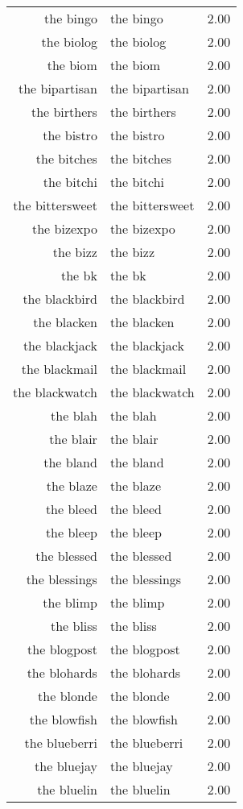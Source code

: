 \begin{table}[ht]
\begin{tabular}{rlr}
  the bingo & the bingo & 2.00 \\ 
  the biolog & the biolog & 2.00 \\ 
  the biom & the biom & 2.00 \\ 
  the bipartisan & the bipartisan & 2.00 \\ 
  the birthers & the birthers & 2.00 \\ 
  the bistro & the bistro & 2.00 \\ 
  the bitches & the bitches & 2.00 \\ 
  the bitchi & the bitchi & 2.00 \\ 
  the bittersweet & the bittersweet & 2.00 \\ 
  the bizexpo & the bizexpo & 2.00 \\ 
  the bizz & the bizz & 2.00 \\ 
  the bk & the bk & 2.00 \\ 
  the blackbird & the blackbird & 2.00 \\ 
  the blacken & the blacken & 2.00 \\ 
  the blackjack & the blackjack & 2.00 \\ 
  the blackmail & the blackmail & 2.00 \\ 
  the blackwatch & the blackwatch & 2.00 \\ 
  the blah & the blah & 2.00 \\ 
  the blair & the blair & 2.00 \\ 
  the bland & the bland & 2.00 \\ 
  the blaze & the blaze & 2.00 \\ 
  the bleed & the bleed & 2.00 \\ 
  the bleep & the bleep & 2.00 \\ 
  the blessed & the blessed & 2.00 \\ 
  the blessings & the blessings & 2.00 \\ 
  the blimp & the blimp & 2.00 \\ 
  the bliss & the bliss & 2.00 \\ 
  the blogpost & the blogpost & 2.00 \\ 
  the blohards & the blohards & 2.00 \\ 
  the blonde & the blonde & 2.00 \\ 
  the blowfish & the blowfish & 2.00 \\ 
  the blueberri & the blueberri & 2.00 \\ 
  the bluejay & the bluejay & 2.00 \\ 
  the bluelin & the bluelin & 2.00 \\ 

\end{tabular}
\end{table}
